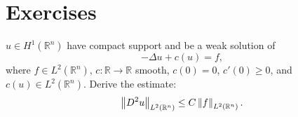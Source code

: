 \section{Exercises}
\begin{exercise}
    $u\in H^{1}(\mathbb{R}^{n})$ have compact support and be a weak solution of 
    \begin{equation}
        -\Delta u+c(u)=f,
    \end{equation}    
    where $f\in L^{2}(\mathbb{R}^{n})$, $c:\mathbb{R}\rightarrow\mathbb{R}$ smooth, $c(0)=0$, $c'(0)\ge 0$, and $c(u)\in L^{2}(\mathbb{R}^{n})$. Derive the estimate:
    \begin{equation}
        \left\|D^{2}u\right\|_{L^{2}(\mathbb{R}^{n})}\le C\left\|f\right\|_{L^{2}(\mathbb{R}^{n})}.
    \end{equation}
\end{exercise}
